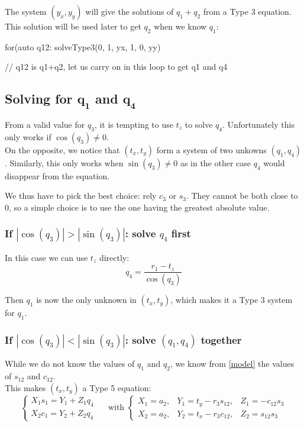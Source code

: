 \documentclass{ecnreport}
\begin{document}
The system $(y_x, y_y)$ will give the solutions of $q_1+q_2$ from a Type 3 equation. This solution will be used later to get $q_2$ when we know $q_1$:

\begin{cppcode}
  for(auto q12: solveType3(0, 1, yx, 1, 0, yy)
    {
        // q12 is q1+q2, let us carry on in this loop to get q1 and q4

    }
\end{cppcode}


    \subsection*{Solving for $\mathbf{q_1}$ and $\mathbf{q_4}$}
    
    From a valid value for $q_3$, it is tempting to use $t_z$ to solve $q_4$. Unfortunately this only works if $\cos(q_3) \neq 0$.\\
    On the opposite, we notice that $(t_x, t_y)$ form a system of two unkowns $(q_1, q_4)$. Similarly, this only works when $\sin(q_3) \neq 0$ as in the other case $q_4$ would disappear from the equation.

    We thus have to pick the best choice: rely $c_3$ or $s_3$. They cannot be both close to 0, so a simple choice is to use the one having the greatest absolute value.

    \subsubsection{If $|\cos(q_3)| > |\sin(q_3)|$: solve $q_4$ first}

    In this case we can use $t_z$ directly:
        \begin{equation*}
    q_4 = \frac{r_1 - t_z}{\cos(q_3)}
    \end{equation*}

    Then $q_1$ is now the only unknown in $(t_x,t_y)$, which makes it a Type 3 system for $q_1$.


    \subsubsection{If $|\cos(q_3)| < |\sin(q_3)|$: solve $(q_1,q_4)$ together}

    While we do not know the values of $q_1$ and $q_2$, we know from \eqref{model} the values of $s_{12}$ and $c_{12}$.\\
    This makes $(t_x,t_y)$ a Type 5 equation:
    \begin{equation*}
    \left\{\begin{array}{l}X_1s_1 = Y_1+Z_1q_4 \\ X_2c_1 = Y_2+Z_2q_4\end{array}\right. \quad \text{ with } 
    \left\{\begin{array}{ccc}
        X_1 = a_2, & Y_1 = t_y-r_3s_{12}, & Z_1 =-c_{12}s_3 \\X_2 = a_2, & Y_2 = t_x-r_3c_{12}, & Z_2 = s_{12}s_3
        \end{array}\right.
    \end{equation*}
    
\end{document}
